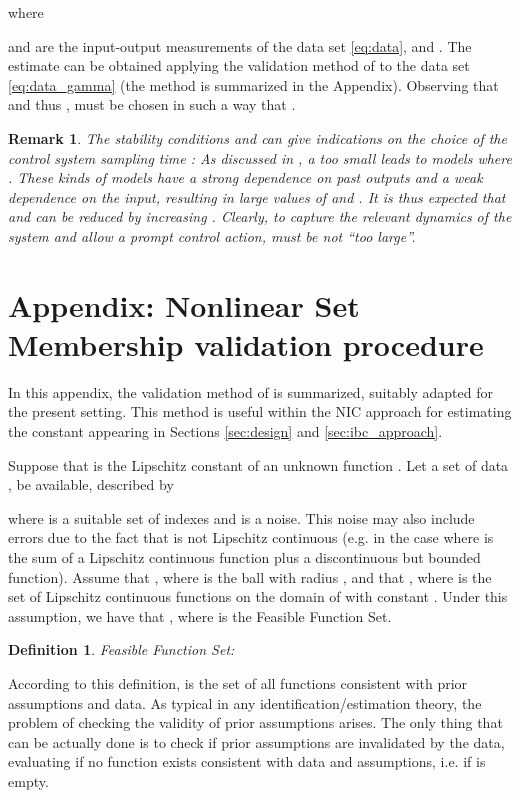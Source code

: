 \documentclass[twocolumn,english,journal]{IEEEtran}
\newtheorem{remark}{Remark}
\newtheorem{definition}{Definition}
\begin{document}
where 

 and  are the input-output measurements
of the data set \eqref{eq:data}, and . The estimate 
can be obtained applying the validation method of \cite{MiNoAUT04}
to the data set \eqref{eq:data_gamma} (the method is summarized in
the Appendix). Observing that 
and thus ,
 must be chosen in such a way that .\medskip{}


\begin{remark}The stability conditions  and 
can give indications on the choice of the control system sampling
time : As discussed in \cite{Goodwin2010}, a too small 
leads to models where . These kinds of
models have a strong dependence on past outputs and a weak dependence
on the input, resulting in large values of  and .
It is thus expected that  and  can be reduced
by increasing . Clearly, to capture the relevant dynamics
of the system and allow a prompt control action,  must be
not ``too large''.\end{remark}


\section{Appendix: Nonlinear Set Membership validation procedure}

\label{appendix1}

In this appendix, the validation method of \cite{MiNoAUT04} is summarized,
suitably adapted for the present setting. This method is useful within
the NIC approach for estimating the constant  appearing
in Sections \ref{sec:design} and \ref{sec:ibc_approach}. 

Suppose that  is the Lipschitz constant of an unknown
function . Let a set of data ,
 be available, described by

where  is a suitable set of indexes and  is
a noise. This noise may also include errors due to the fact that 
is not Lipschitz continuous (e.g. in the case where 
is the sum of a Lipschitz continuous function plus a discontinuous
but bounded function). Assume that , where
 is the  ball with radius ,
and that , where
 is the set of Lipschitz continuous
functions on the domain of  with constant .
Under this assumption, we have that , where
 is the Feasible Function Set.\medskip{}


\begin{definition} \emph{Feasible Function Set}:

 \end{definition}\medskip{}


According to this definition,  is the set of all functions consistent
with prior assumptions and data. As typical in any identification/estimation
theory, the problem of checking the validity of prior assumptions
arises. The only thing that can be actually done is to check if prior
assumptions are invalidated by the data, evaluating if no function
exists consistent with data and assumptions, i.e. if  is empty.\medskip{}
\end{document}
